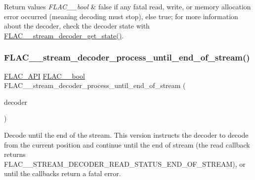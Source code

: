 \begin{DoxyRetVals}{Return values}
{\em F\+L\+A\+C\+\_\+\+\_\+bool} & {\ttfamily false} if any fatal read, write, or memory allocation error occurred (meaning decoding must stop), else {\ttfamily true}; for more information about the decoder, check the decoder state with \hyperlink{group__flac__stream__decoder_ga5899c204ad7183ec04e41855090c0635}{F\+L\+A\+C\+\_\+\+\_\+stream\+\_\+decoder\+\_\+get\+\_\+state()}. \\
\hline
\end{DoxyRetVals}
\mbox{\label{group__flac__stream__decoder_ga4544352442870ea9f16f388a97d81dff}} 
\subsubsection{\texorpdfstring{F\+L\+A\+C\+\_\+\+\_\+stream\+\_\+decoder\+\_\+process\+\_\+until\+\_\+end\+\_\+of\+\_\+stream()}{FLAC\_\_stream\_decoder\_process\_until\_end\_of\_stream()}}
{\footnotesize\ttfamily \hyperlink{group__flac__export_ga56ca07df8a23310707732b1c0007d6f5}{F\+L\+A\+C\+\_\+\+A\+PI} \hyperlink{ordinals_8h_a95103469f1cbd78b8cf250194985b34e}{F\+L\+A\+C\+\_\+\+\_\+bool} F\+L\+A\+C\+\_\+\+\_\+stream\+\_\+decoder\+\_\+process\+\_\+until\+\_\+end\+\_\+of\+\_\+stream (\begin{DoxyParamCaption}\item[{\hyperlink{struct_f_l_a_c_____stream_decoder}{F\+L\+A\+C\+\_\+\+\_\+\+Stream\+Decoder} $\ast$}]{decoder }\end{DoxyParamCaption})}

Decode until the end of the stream. This version instructs the decoder to decode from the current position and continue until the end of stream (the read callback returns {\ttfamily F\+L\+A\+C\+\_\+\+\_\+\+S\+T\+R\+E\+A\+M\+\_\+\+D\+E\+C\+O\+D\+E\+R\+\_\+\+R\+E\+A\+D\+\_\+\+S\+T\+A\+T\+U\+S\+\_\+\+E\+N\+D\+\_\+\+O\+F\+\_\+\+S\+T\+R\+E\+AM}), or until the callbacks return a fatal error.

